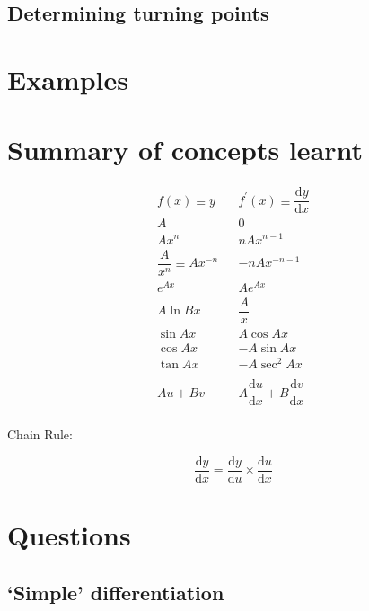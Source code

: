\documentclass[
]{book}
\begin{document}
\hypertarget{subsec:turningpoints}{%
\subsection{Determining turning points}\label{subsec:turningpoints}}

\hypertarget{examples-1}{%
\section{Examples}\label{examples-1}}

\hypertarget{summary-of-concepts-learnt-1}{%
\section{Summary of concepts learnt}\label{summary-of-concepts-learnt-1}}

\begin{equation*}
\begin{array}{ccc}
  f(x) \equiv y & & f^{\prime}(x) \equiv \dfrac{\textrm{d}y}{\textrm{d}x}\\
  \hline
A & &0 \\
 Ax^n & &nAx^{n-1} \\
 \dfrac{A}{x^n} \equiv A x^{-n} & &-nA x^{-n-1} \\
e^{Ax} & &Ae^{Ax} \\
A \ln Bx & &\dfrac{A}{x} \\
\sin Ax & &A\cos Ax \\
\cos Ax & &-A\sin Ax \\
\tan Ax & &-A\sec^2 Ax \\
\\
Au + Bv & &A\dfrac{\textrm{d}u}{\textrm{d}x} + B\dfrac{\textrm{d}v}{\textrm{d}x} \\
\end{array}
\end{equation*}

Chain Rule:

\begin{equation*}
\dfrac{\textrm{d}y}{\textrm{d}x}=\dfrac{\textrm{d}y}{\textrm{d}u} \times \dfrac{\textrm{d}u}{\textrm{d}x}
\end{equation*}

\hypertarget{sec:Questions4}{%
\section{Questions}\label{sec:Questions4}}

\hypertarget{simple-differentiation}{%
\subsection{`Simple' differentiation}\label{simple-differentiation}}
\end{document}
